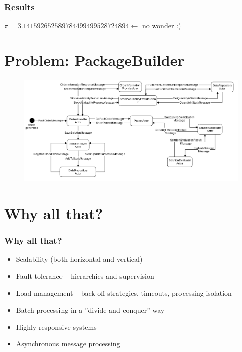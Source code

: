 \documentclass[xcolor=dvipsnames]{beamer}
\begin{document}
\begin{frame}
\frametitle{Results}
$\pi = 3.141592652589784499499528724894 \gets$ no wonder :)
\end{frame}


\section{Problem: PackageBuilder}

\begin{frame}
\begin{figure}
%
\includegraphics[width=\textwidth]{PB}
\end{figure}
\end{frame}

\section{Why all that?}

\begin{frame}
\frametitle{Why all that?}
\begin{itemize}
\item Scalability (both horizontal and vertical)
\item Fault tolerance -- hierarchies and supervision
\item Load management -- back-off strategies, timeouts, processing isolation
\item Batch processing in a ''divide and conquer'' way
\item Highly responsive systems
\item Asynchronous message processing
\end{itemize}
\end{frame}
\end{document}
